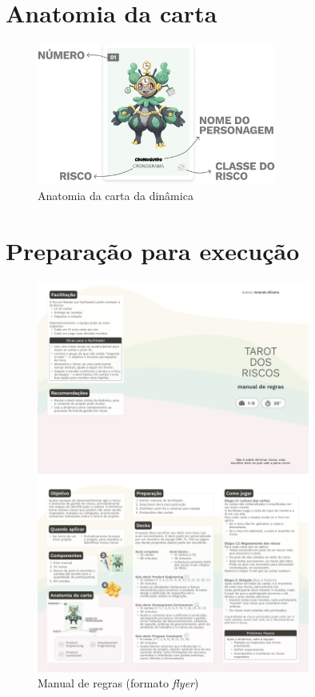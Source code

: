 \documentclass[
	12pt,
	openright,
	twoside,
	a4paper,
	english,
	brazil
	]{abntex2}
\begin{document}
\section{Anatomia da carta}

\begin{figure}[H]
  \centering
	\caption{\label{anatomia-carta} Anatomia da carta da dinâmica}
  \includegraphics[width=0.7\textwidth]{anatomia-carta}
\end{figure}

\section{Preparação para execução}

\begin{figure}[H]
  \centering
	\caption{\label{manual-tarot} Manual de regras (formato \textit{flyer})}
  \includegraphics[width=0.8\textwidth]{manual-tarot}
\end{figure}
\end{document}
